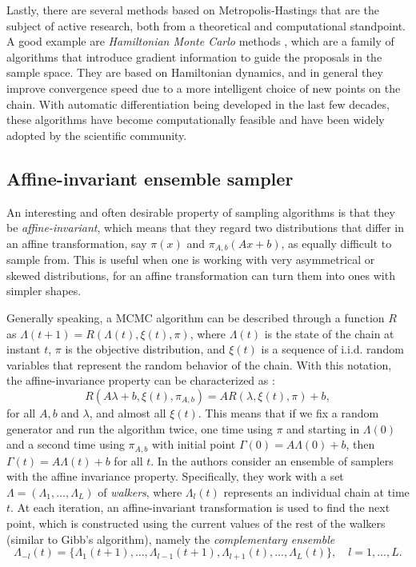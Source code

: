 Lastly, there are several methods based on Metropolis-Hastings that are the subject of active research, both from a theoretical and computational standpoint. A good example are \textit{Hamiltonian Monte Carlo} methods \citep[e.g.][]{neal2011mcmc}, which are a family of algorithms that introduce gradient information to guide the proposals in the sample space. They are based on Hamiltonian dynamics, and in general they improve convergence speed due to a more intelligent choice of new points on the chain. With automatic differentiation being developed in the last few decades, these algorithms have become computationally feasible and have been widely adopted by the scientific community.

\subsection*{Affine-invariant ensemble sampler}

An interesting and often desirable property of sampling algorithms is that they be \textit{affine-invariant}, which means that they regard two distributions that differ in an affine transformation, say \(\pi(x)\) and \(\pi_{A, b}(Ax + b)\), as equally difficult to sample from. This is useful when one is working with very asymmetrical or skewed distributions, for an affine transformation can turn them into ones with simpler shapes.

Generally speaking, a MCMC algorithm can be described through a function \(R\) as \(\Lambda(t+1)=R(\Lambda(t), \xi(t), \pi)\), where \(\Lambda(t)\) is the state of the chain at instant \(t\), \(\pi\) is the objective distribution, and \(\xi(t)\) is a sequence of i.i.d. random variables that represent the random behavior of the chain. With this notation, the  affine-invariance property can be characterized as \citep{goodman2010ensemble}:
 \[
 R(A\lambda+b, \xi(t), \pi_{A,b}) = AR(\lambda, \xi(t), \pi) + b,
 \]
 for all \(A,b\) and \(\lambda\), and almost all \(\xi(t)\). This means that if we fix a random generator and run the algorithm twice, one time using \(\pi\) and starting in \(\Lambda(0)\) and a second time using \(\pi_{A,b}\) with initial point \(\Gamma(0)=A\Lambda(0)+b\), then \(\Gamma(t)=A\Lambda(t)+b\) for all \(t\). In \citet{goodman2010ensemble} the authors consider an ensemble of samplers with the affine invariance property. Specifically, they work with a set \(\Lambda=(\Lambda_1, \dots, \Lambda_L)\) of \textit{walkers}, where \(\Lambda_l(t)\) represents an individual chain at time \(t\). At each iteration, an affine-invariant transformation is used to find the next point, which is constructed using the current values of the rest of the walkers (similar to Gibb's algorithm), namely the \textit{complementary ensemble}
 \[
  \Lambda_{-l}(t) = \{\Lambda_1(t+1), \dots, \Lambda_{l-1}(t+1), \Lambda_{l+1}(t), \dots, \Lambda_L(t)\}, \quad l=1,\dots, L.
  \]

